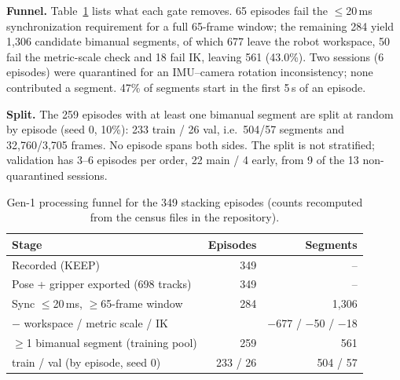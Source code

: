 \documentclass[conference,10pt]{IEEEtran}
\begin{document}
\textbf{Funnel.} Table~\ref{tab:funnel} lists what each gate removes. 65 episodes fail the $\le$20\,ms synchronization requirement
for a full 65-frame window; the remaining 284 yield 1{,}306 candidate bimanual segments, of which 677 leave the robot workspace,
50 fail the metric-scale check and 18 fail IK, leaving 561 (43.0\%). Two sessions (6 episodes) were quarantined for an
IMU--camera rotation inconsistency; none contributed a segment. 47\% of segments start in the first 5\,s of an episode.

\textbf{Split.} The 259 episodes with at least one bimanual segment are split at random by episode (seed 0, 10\%): 233 train / 26
val, i.e.\ 504/57 segments and 32{,}760/3{,}705 frames. No episode spans both sides. The split is not stratified; validation has
3--6 episodes per order, 22 main / 4 early, from 9 of the 13 non-quarantined sessions.

\begin{table}[t]
\centering\footnotesize
\caption{Gen-1 processing funnel for the 349 stacking episodes (counts recomputed from the census files in the repository).}
\label{tab:funnel}
\setlength{\tabcolsep}{4pt}\begin{tabular}{@{}lrr@{}}
\toprule
Stage & Episodes & Segments \\
\midrule
Recorded (KEEP) & 349 & -- \\
Pose + gripper exported (698 tracks) & 349 & -- \\
Sync $\le$20\,ms, $\ge$65-frame window & 284 & 1{,}306 \\
\quad $-$ workspace / metric scale / IK & & $-$677 / $-$50 / $-$18 \\
$\ge$1 bimanual segment (training pool) & 259 & 561 \\
\quad train / val (by episode, seed 0) & 233 / 26 & 504 / 57 \\
\bottomrule
\end{tabular}
\end{table}
\end{document}
